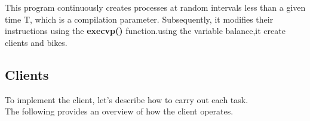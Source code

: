 This program continuously creates processes at random intervals less than a given time T, which is a compilation parameter. Subsequently, it modifies their instructions using the \textbf{execvp()} function.using the variable balance,it create clients and bikes.

\newpage

\subsection{Clients}
To implement the client, let's describe how to carry out each task.\\ The following provides an overview of how the client operates.\\

